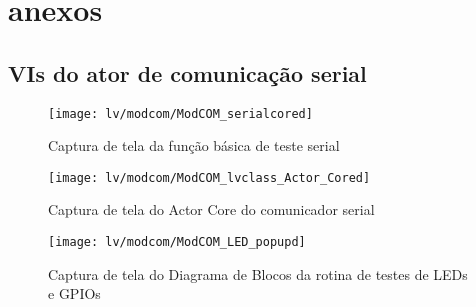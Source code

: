 \chapter{anexos}

\section{VIs do ator de comunicação serial}

        \begin{figure}
                \centering
                 \texttt{[image: lv/modcom/ModCOM\_serialcored]}
                \caption{Captura de tela da função básica de teste serial}
                \label{fig:serialcored}
        \end{figure}
        
        \begin{figure}
                \centering
                 \texttt{[image: lv/modcom/ModCOM\_lvclass\_Actor\_Cored]}
                \caption{Captura de tela do Actor Core do comunicador serial}
                \label{fig:modcomcore}
        \end{figure}
        
        \begin{figure}
                \centering
                 \texttt{[image: lv/modcom/ModCOM\_LED\_popupd]}
                \caption{Captura de tela do Diagrama de Blocos da rotina de testes de LEDs e GPIOs}
                \label{fig:modcomledd}
        \end{figure}
        
        
        
